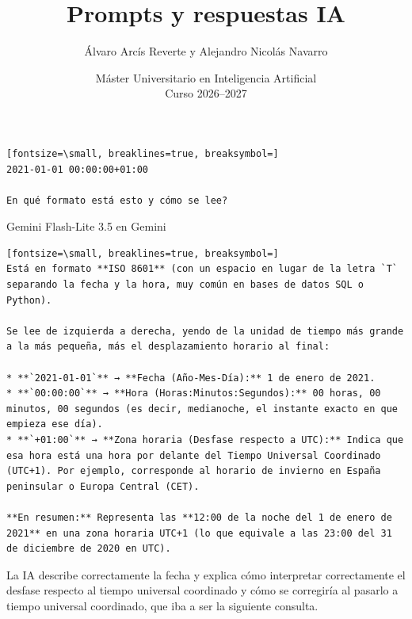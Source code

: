 \documentclass[12pt,a4paper,oneside]{book}
\title{Prompts y respuestas IA}
\author{Álvaro Arcís Reverte y Alejandro Nicolás Navarro}
\date{Máster Universitario en Inteligencia Artificial \\ Curso 2026--2027}
\begin{document}
\maketitle

\cleardoublepage

\begin{iaprompt}
\begin{Verbatim}[fontsize=\small, breaklines=true, breaksymbol=]
2021-01-01 00:00:00+01:00

En qué formato está esto y cómo se lee?
\end{Verbatim}
\end{iaprompt}
\begin{iaresp}{Gemini Flash-Lite 3.5 en Gemini}
\begin{Verbatim}[fontsize=\small, breaklines=true, breaksymbol=]
Está en formato **ISO 8601** (con un espacio en lugar de la letra `T` separando la fecha y la hora, muy común en bases de datos SQL o Python).

Se lee de izquierda a derecha, yendo de la unidad de tiempo más grande a la más pequeña, más el desplazamiento horario al final:

* **`2021-01-01`** → **Fecha (Año-Mes-Día):** 1 de enero de 2021.
* **`00:00:00`** → **Hora (Horas:Minutos:Segundos):** 00 horas, 00 minutos, 00 segundos (es decir, medianoche, el instante exacto en que empieza ese día).
* **`+01:00`** → **Zona horaria (Desfase respecto a UTC):** Indica que esa hora está una hora por delante del Tiempo Universal Coordinado (UTC+1). Por ejemplo, corresponde al horario de invierno en España peninsular o Europa Central (CET).

**En resumen:** Representa las **12:00 de la noche del 1 de enero de 2021** en una zona horaria UTC+1 (lo que equivale a las 23:00 del 31 de diciembre de 2020 en UTC).
\end{Verbatim}
\end{iaresp}
\begin{iaanalisis}
La IA describe correctamente la fecha y explica cómo interpretar correctamente el desfase respecto al tiempo universal coordinado y cómo se corregiría al pasarlo a tiempo universal coordinado, que iba a ser la siguiente consulta.
\end{iaanalisis}
\end{document}
